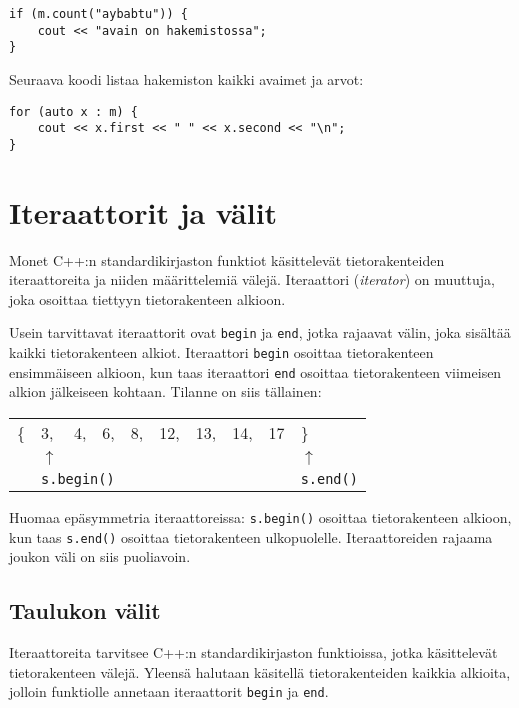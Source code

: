 \begin{lstlisting}
if (m.count("aybabtu")) {
    cout << "avain on hakemistossa";
}
\end{lstlisting}

Seuraava koodi listaa hakemiston
kaikki avaimet ja arvot:

\begin{lstlisting}
for (auto x : m) {
    cout << x.first << " " << x.second << "\n";
}
\end{lstlisting}

\section{Iteraattorit ja välit}

Monet C++:n standardikirjaston funktiot
käsittelevät tietorakenteiden iteraattoreita
ja niiden määrittelemiä välejä.
Iteraattori (\textit{iterator}) on muuttuja,
joka osoittaa tiettyyn tietorakenteen alkioon.

Usein tarvittavat iteraattorit ovat \texttt{begin}
ja \texttt{end}, jotka rajaavat välin,
joka sisältää kaikki tietorakenteen alkiot.
Iteraattori \texttt{begin} osoittaa
tietorakenteen ensimmäiseen alkioon,
kun taas iteraattori \texttt{end} osoittaa
tietorakenteen viimeisen alkion jälkeiseen kohtaan.
Tilanne on siis tällainen:

\begin{center}
\begin{tabular}{llllllllll}
\{ & 3, & 4, & 6, & 8, & 12, & 13, & 14, & 17 & \} \\
& $\uparrow$ & & & & & & & & $\uparrow$ \\
& \multicolumn{3}{l}{\texttt{s.begin()}} & & & & & & \texttt{s.end()} \\
\end{tabular}
\end{center}

Huomaa epäsymmetria iteraattoreissa:
\texttt{s.begin()} osoittaa tietorakenteen alkioon,
kun taas \texttt{s.end()} osoittaa tietorakenteen ulkopuolelle.
Iteraattoreiden rajaama joukon väli on siis puoliavoin.

\subsection{Taulukon välit}

Iteraattoreita tarvitsee
C++:n standardikirjaston funktioissa, jotka käsittelevät
tietorakenteen välejä.
Yleensä halutaan käsitellä tietorakenteiden kaikkia
alkioita, jolloin funktiolle annetaan
iteraattorit \texttt{begin} ja \texttt{end}.

